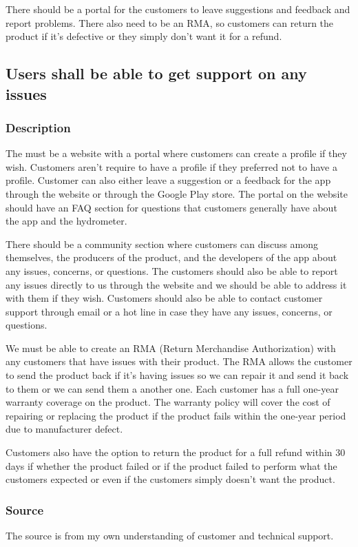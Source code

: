 There should be a portal for the customers to leave suggestions and feedback and report problems. There also need to be an RMA, so customers can return the product if it's defective or they simply don't want it for a refund.

\subsection{Users shall be able to get support on any issues}
\subsubsection{Description}
The must be a website with a portal where customers can create a profile if they wish. Customers aren't require to have a profile if they preferred not to have a profile. Customer can also either leave a suggestion or a feedback for the app through the website or through the Google Play store. The portal on the website should have an FAQ section for questions that customers generally have about the app and the hydrometer.

There should be a community section where customers can discuss among themselves, the producers of the product, and the developers of the app about any issues, concerns, or questions. The customers should also be able to report any issues directly to us through the website and we should be able to address it with them if they wish. Customers should also be able to contact customer support through email or a hot line in case they have any issues, concerns, or questions.

We must be able to create an RMA (Return Merchandise Authorization) with any customers that have issues with their product. The RMA allows the customer to send the product back if it's having issues so we can repair it and send it back to them or we can send them a another one. Each customer has a full one-year warranty coverage on the product. The warranty policy will cover the cost of repairing or replacing the product if the product fails within the one-year period due to manufacturer defect.

Customers also have the option to return the product for a full refund within 30 days if whether the product failed or if the product failed to perform what the customers expected or even if the customers simply doesn't want the product.
\subsubsection{Source}
The source is from my own understanding of customer and technical support.
